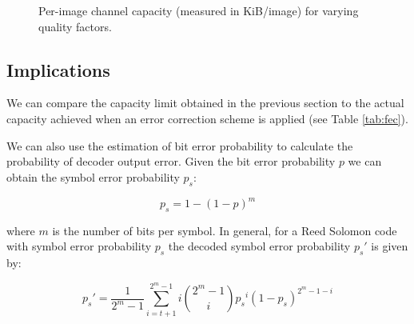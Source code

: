 \begin{figure}[tbph]
  \begin{center}
    \caption{Per-image channel capacity (measured in KiB/image) for varying quality factors.}
    \label{graph:capacity}
  \end{center}
\end{figure}

\subsection{Implications}
\label{sec:cap:imp}

We can compare the capacity limit obtained in the previous section to the actual capacity achieved when an error correction scheme is applied (see Table \ref{tab:fec}).

We can also use the estimation of bit error probability to calculate the probability of decoder output error. Given the bit error probability $p$ we can obtain the symbol error probability $p_s$:

\begin{equation}
    p_s = 1 - (1-p)^m
\end{equation}

where $m$ is the number of bits per symbol. In general, for a Reed Solomon code with symbol error probability $p_s$ the decoded symbol error probability $p_s'$ is given by:

\begin{equation}
    p_s' = \frac{1}{2^m -1} \sum^{2^m - 1}_{i = t+1} i {{2^m - 1}\choose{i}} {p_s}^i (1-{p_s})^{2^m - 1 - i}
\end{equation}

